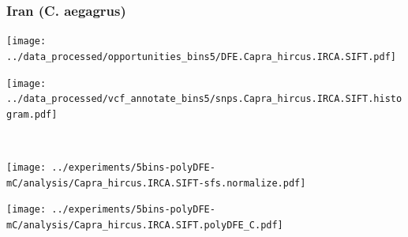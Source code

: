 \subsubsection{Iran (C. aegagrus)}

\begin{minipage}{0.49\linewidth}
    \texttt{[image: ../data\_processed/opportunities\_bins5/DFE.Capra\_hircus.IRCA.SIFT.pdf]}
\end{minipage}
\begin{minipage}{0.49\linewidth}
    \texttt{[image: ../data\_processed/vcf\_annotate\_bins5/snps.Capra\_hircus.IRCA.SIFT.histogram.pdf]}
\end{minipage}
\\
\begin{minipage}{0.49\linewidth}
    \texttt{[image: ../experiments/5bins-polyDFE-mC/analysis/Capra\_hircus.IRCA.SIFT-sfs.normalize.pdf]}
\end{minipage}
\begin{minipage}{0.4\linewidth}
    \texttt{[image: ../experiments/5bins-polyDFE-mC/analysis/Capra\_hircus.IRCA.SIFT.polyDFE\_C.pdf]}
\end{minipage}

